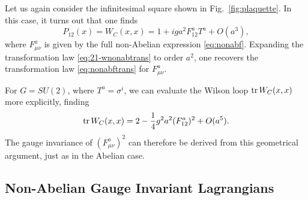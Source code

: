 \begin{example}
  Let us again consider the infinitesimal square shown in Fig.~\ref{fig:plaquette}.
  In this case, it turns out that one finds
  \begin{equation}
    P_{12}(x) = W_C(x, x) = 1 + i g a^2 F^{a}_{12} T^{a} + O(a^3),
  \end{equation}
  where $F^{a}_{\mu\nu}$ is given by the full non-Abelian expression \eqref{eq:nonabf}.
  Expanding the transformation law \eqref{eq:21-wnonabtrans} to order $a^2$, one recovers the transformation law \eqref{eq:nonabftrans} for $F^{a}_{\mu\nu}$.
  
  For $G =SU(2)$, where $T^{a} = \sigma^{i}$, we can evaluate the Wilson loop $\tr W_C(x, x)$ more explicitly, finding
  \begin{equation}
    \tr W_C(x, x) = 2 - \frac{1}{4} g^2 a^2 (F^{a}_{12})^2 + O(a^5).
  \end{equation}
  The gauge invariance of $(F^{a}_{\mu\nu})^2$ can therefore be derived from this geometrical argument, just as in the Abelian case.
\end{example}

\subsection{Non-Abelian Gauge Invariant Lagrangians}%
\label{sub:gauge_invariant_lagrangians}

